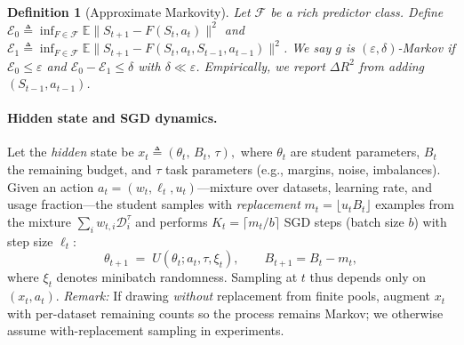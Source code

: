 \documentclass[11pt]{article}
\newtheorem{definition}{Definition}
\newcommand{\E}{\mathbb{E}}
\newcommand{\1}{\mathbf{1}}
\begin{document}
\begin{definition}[Approximate Markovity]
\label{def:approx-markov-tight}
Let $\mathcal{F}$ be a rich predictor class. Define
$\mathcal{E}_0 \triangleq \inf_{F\in\mathcal{F}} \E\| S_{t+1} - F(S_t,a_t)\|^2$
and
$\mathcal{E}_1 \triangleq \inf_{F\in\mathcal{F}} \E\| S_{t+1} - F(S_t,a_t,S_{t-1},a_{t-1})\|^2$.
We say $g$ is $(\varepsilon,\delta)$-Markov if $\mathcal{E}_0 \le \varepsilon$ and
$\mathcal{E}_0 - \mathcal{E}_1 \le \delta$ with $\delta \ll \varepsilon$.
Empirically, we report $\Delta R^2$ from adding $(S_{t-1},a_{t-1})$.
\end{definition}

\paragraph{Hidden state and SGD dynamics.}
Let the \emph{hidden} state be
\(
x_t \triangleq (\theta_t,\,B_t,\,\tau),
\)
where $\theta_t$ are student parameters, $B_t$ the remaining budget, and $\tau$ task parameters (e.g., margins, noise, imbalances).
Given an action $a_t=(w_t,\ell_t,u_t)$---mixture over datasets, learning rate, and usage fraction---the student samples with \emph{replacement} $m_t=\lfloor u_t B_t\rfloor$ examples from the mixture $\sum_i w_{t,i}\mathcal{D}_i^\tau$ and performs $K_t=\lceil m_t/b\rceil$ SGD steps (batch size $b$) with step size $\ell_t$:
\begin{equation}
\theta_{t+1} \;=\; U(\theta_t; a_t, \tau, \xi_t),\qquad B_{t+1}=B_t-m_t,
\end{equation}
where $\xi_t$ denotes minibatch randomness.
Sampling at $t$ thus depends only on $(x_t,a_t)$.
\textit{Remark:} If drawing \emph{without} replacement from finite pools, augment $x_t$ with per-dataset remaining counts so the process remains Markov; we otherwise assume with-replacement sampling in experiments.
\end{document}
